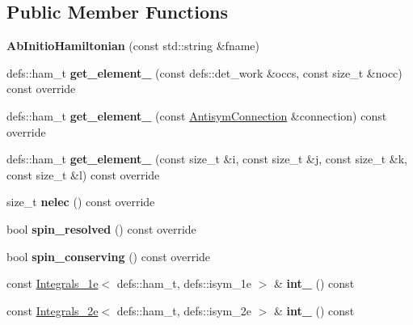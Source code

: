 \subsection*{Public Member Functions}
\begin{DoxyCompactItemize}
\item 
{\bfseries Ab\+Initio\+Hamiltonian} (const std\+::string \&fname)\hypertarget{classAbInitioHamiltonian_a4aa129e13515a9d1b1d6fd659d36432f}{}\label{classAbInitioHamiltonian_a4aa129e13515a9d1b1d6fd659d36432f}

\item 
defs\+::ham\+\_\+t {\bfseries get\+\_\+element\+\_} (const defs\+::det\+\_\+work \&occs, const size\+\_\+t \&nocc) const override\hypertarget{classAbInitioHamiltonian_a3d2a53be607a17c7f8461e5d9dd8380e}{}\label{classAbInitioHamiltonian_a3d2a53be607a17c7f8461e5d9dd8380e}

\item 
defs\+::ham\+\_\+t {\bfseries get\+\_\+element\+\_} (const \hyperlink{classAntisymConnection}{Antisym\+Connection} \&connection) const override\hypertarget{classAbInitioHamiltonian_ade6591be81ad6f1b9604ae5fc66f6010}{}\label{classAbInitioHamiltonian_ade6591be81ad6f1b9604ae5fc66f6010}

\item 
defs\+::ham\+\_\+t {\bfseries get\+\_\+element\+\_} (const size\+\_\+t \&i, const size\+\_\+t \&j, const size\+\_\+t \&k, const size\+\_\+t \&l) const override\hypertarget{classAbInitioHamiltonian_af8d0596a4876dd88db46eed075eba4c5}{}\label{classAbInitioHamiltonian_af8d0596a4876dd88db46eed075eba4c5}

\item 
size\+\_\+t {\bfseries nelec} () const override\hypertarget{classAbInitioHamiltonian_a9e636c2c9e129d8c10ea909be3b04e7c}{}\label{classAbInitioHamiltonian_a9e636c2c9e129d8c10ea909be3b04e7c}

\item 
bool {\bfseries spin\+\_\+resolved} () const override\hypertarget{classAbInitioHamiltonian_a929c348348755243865bf6a9c9e812cd}{}\label{classAbInitioHamiltonian_a929c348348755243865bf6a9c9e812cd}

\item 
bool {\bfseries spin\+\_\+conserving} () const override\hypertarget{classAbInitioHamiltonian_af2917e415e826b1b647a22e023115eb3}{}\label{classAbInitioHamiltonian_af2917e415e826b1b647a22e023115eb3}

\item 
const \hyperlink{classIntegrals__1e}{Integrals\+\_\+1e}$<$ defs\+::ham\+\_\+t, defs\+::isym\+\_\+1e $>$ \& {\bfseries int\+\_} () const \hypertarget{classAbInitioHamiltonian_ae225b305af0ffde59b9c7dc9e451cfc6}{}\label{classAbInitioHamiltonian_ae225b305af0ffde59b9c7dc9e451cfc6}

\item 
const \hyperlink{classIntegrals__2e}{Integrals\+\_\+2e}$<$ defs\+::ham\+\_\+t, defs\+::isym\+\_\+2e $>$ \& {\bfseries int\+\_} () const \hypertarget{classAbInitioHamiltonian_aac57c2866474e1a90be12b2c1d80e0cc}{}\label{classAbInitioHamiltonian_aac57c2866474e1a90be12b2c1d80e0cc}

\end{DoxyCompactItemize}
